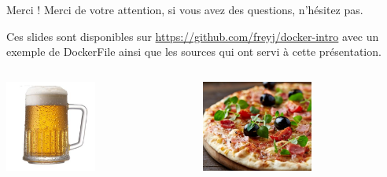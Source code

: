 
\begin{frame}{Merci !}
    Merci de votre attention, si vous avez des questions, n'hésitez pas.
    
    Ces slides sont disponibles sur \href{https://github.com/freyj/}{https://github.com/freyj/docker-intro} 
    avec un exemple de DockerFile ainsi que les sources qui ont servi à cette présentation.
    
    \begin{columns}
        \begin{column}{0.5\textwidth}
            \includegraphics[height=3cm]{img/biere.jpg}
        \end{column}
        \begin{column}{0.5\textwidth}
            \includegraphics[height=3cm]{img/pizza.jpg}
        \end{column}
    \end{columns}
\end{frame}